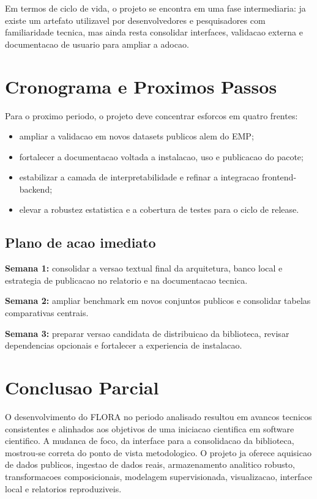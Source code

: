 \documentclass[12pt,a4paper]{article}
\begin{document}
Em termos de ciclo de vida, o projeto se encontra em uma fase intermediaria: ja existe um artefato utilizavel por desenvolvedores e pesquisadores com familiaridade tecnica, mas ainda resta consolidar interfaces, validacao externa e documentacao de usuario para ampliar a adocao.

\section{Cronograma e Proximos Passos}

Para o proximo periodo, o projeto deve concentrar esforcos em quatro frentes:

\begin{itemize}[leftmargin=1.5cm]
    \item ampliar a validacao em novos datasets publicos alem do EMP;
    \item fortalecer a documentacao voltada a instalacao, uso e publicacao do pacote;
    \item estabilizar a camada de interpretabilidade e refinar a integracao frontend-backend;
    \item elevar a robustez estatistica e a cobertura de testes para o ciclo de release.
\end{itemize}

\subsection{Plano de acao imediato}

\textbf{Semana 1:} consolidar a versao textual final da arquitetura, banco local e estrategia de publicacao no relatorio e na documentacao tecnica.

\textbf{Semana 2:} ampliar benchmark em novos conjuntos publicos e consolidar tabelas comparativas centrais.

\textbf{Semana 3:} preparar versao candidata de distribuicao da biblioteca, revisar dependencias opcionais e fortalecer a experiencia de instalacao.

\section{Conclusao Parcial}

O desenvolvimento do FLORA no periodo analisado resultou em avancos tecnicos consistentes e alinhados aos objetivos de uma iniciacao cientifica em software cientifico. A mudanca de foco, da interface para a consolidacao da biblioteca, mostrou-se correta do ponto de vista metodologico. O projeto ja oferece aquisicao de dados publicos, ingestao de dados reais, armazenamento analitico robusto, transformacoes composicionais, modelagem supervisionada, visualizacao, interface local e relatorios reproduziveis.
\end{document}
